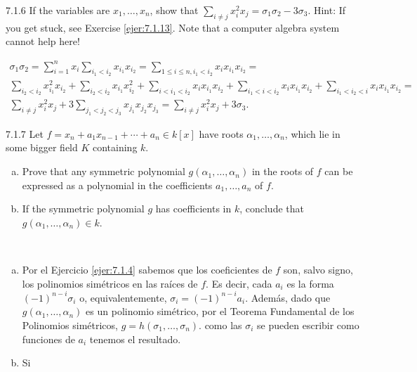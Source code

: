 \documentclass[twoside]{article}
\begin{document}
\begin{ejercicio}{7.1.6}
If the variables are $x_1, \dots , x_n$, show that $\sum_{i\neq j} x^2_i
x_j = σ_1σ_2 −3σ_3$. Hint: If you get stuck,
see Exercise \ref{ejer:7.1.13}. Note that a computer algebra system cannot help here!
\end{ejercicio}
\begin{solucion}
\begin{gather*}
\sigma_1\sigma_2=\sum_{i=1}^nx_i\sum_{i_1<i_2}x_{i_1}x_{i_2}=\sum_{1\leq i\leq n, i_1<i_2}x_ix_{i_1}x_{i_2}=\\
\sum_{i_2<i_2}x_{i_1}^2x_{i_2}+\sum_{i_2<i_2}x_{i_1}x_{i_2}^2+\sum_{i<i_1<i_2}x_ix_{i_1}x_{i_2}+\sum_{i_1<i<i_2}x_ix_{i_1}x_{i_2}+\sum_{i_1<i_2<i}x_ix_{i_1}x_{i_2}=\\
\sum_{i\neq j} x_i^2x_j+3\sum_{j_1<j_2<j_3}x_{j_1}x_{j_2}x_{j_3}=\sum_{i\neq j} x_i^2x_j+3\sigma_3.
\end{gather*}
\end{solucion}
\newpage

\begin{ejercicio}{7.1.7}
Let $f = x_n + a_1x_{n−1} + \cdots + a_n ∈ k[x]$ have roots $α_1,\dots, α_n$, which lie in some bigger
field $K$ containing $k$.
\begin{enumerate}[a.]
\item Prove that any symmetric polynomial $g(α_1, \dots , α_n)$ in the roots of $f$ can be expressed
as a polynomial in the coefficients $a_1, \dots , a_n$ of $f$.
\item If the symmetric polynomial $g$ has coefficients in $k$, conclude that
$g(α_1, \dots , α_n) ∈ k$.
\end{enumerate}
 
\end{ejercicio}
\begin{solucion}\
\begin{enumerate}[a.]
\item Por el Ejercicio \ref{ejer:7.1.4} sabemos que los coeficientes de $f$ son, salvo signo, los polinomios simétricos en las raíces de $f$. Es decir, cada $a_i$ es la forma $(-1)^{n-i}\sigma_i$ o, equivalentemente, $\sigma_i = (-1)^{n-i}a_i$. Además, dado que $g(\alpha_1,\dotsc,\alpha_n)$ es un polinomio simétrico, por el Teorema Fundamental de los Polinomios simétricos, $g=h(\sigma_1,\dotsc,\sigma_n)$. como las $\sigma_i$ se pueden escribir como funciones de $a_i$ tenemos el resultado.
\item Si
\end{enumerate}

\end{solucion}
\end{document}
